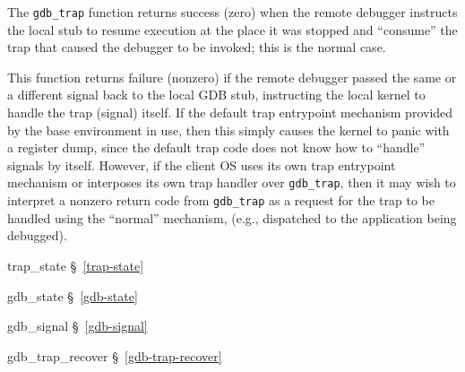 \begin{apiret}
	The {\tt gdb_trap} function returns success (zero)
	when the remote debugger instructs the local stub
	to resume execution at the place it was stopped
	and ``consume'' the trap that caused the debugger to be invoked;
	this is the normal case.

	This function returns failure (nonzero)
	if the remote debugger passed the same or a different signal
	back to the local GDB stub,
	instructing the local kernel to handle the trap (signal) itself.
	If the default trap entrypoint mechanism
	provided by the base environment in use,
	then this simply causes the kernel to panic with a register dump,
	since the default trap code does not know
	how to ``handle'' signals by itself.
	However, if the client OS uses its own trap entrypoint mechanism
	or interposes its own trap handler over {\tt gdb_trap},
	then it may wish to interpret a nonzero return code from {\tt gdb_trap}
	as a request for the trap to be handled using the ``normal'' mechanism,
	(e.g., dispatched to the application being debugged).
\end{apiret}
\begin{apidep}
	\item[trap_state]		\S~\ref{trap-state}
	\item[gdb_state]		\S~\ref{gdb-state}
	\item[gdb_signal]		\S~\ref{gdb-signal}
	\item[gdb_trap_recover]		\S~\ref{gdb-trap-recover}
\end{apidep}

